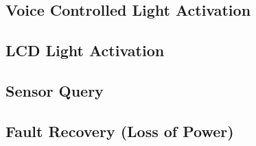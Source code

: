 
\subsection{Voice Controlled Light Activation}

\subsection{LCD Light Activation}

\subsection{Sensor Query}

\subsection{Fault Recovery (Loss of Power)}


